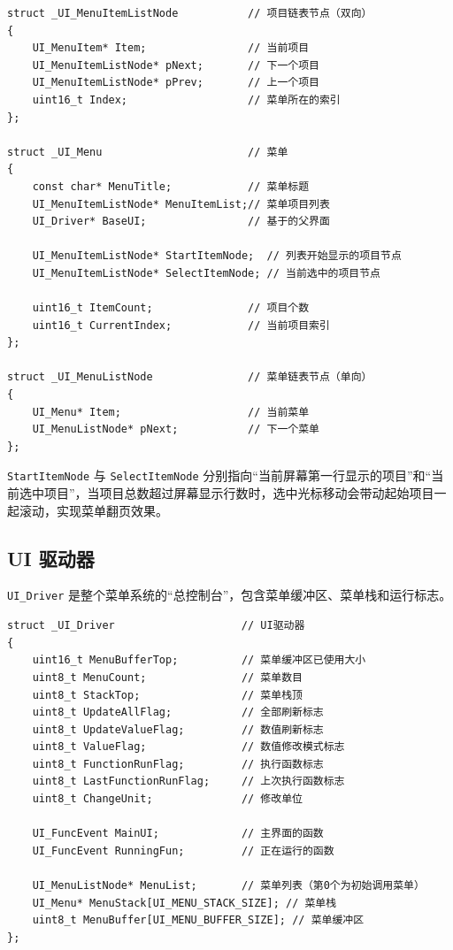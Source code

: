 \begin{lstlisting}[style=c]
struct _UI_MenuItemListNode           // 项目链表节点（双向）
{
    UI_MenuItem* Item;                // 当前项目
    UI_MenuItemListNode* pNext;       // 下一个项目
    UI_MenuItemListNode* pPrev;       // 上一个项目
    uint16_t Index;                   // 菜单所在的索引
};

struct _UI_Menu                       // 菜单
{
    const char* MenuTitle;            // 菜单标题
    UI_MenuItemListNode* MenuItemList;// 菜单项目列表
    UI_Driver* BaseUI;                // 基于的父界面

    UI_MenuItemListNode* StartItemNode;  // 列表开始显示的项目节点
    UI_MenuItemListNode* SelectItemNode; // 当前选中的项目节点

    uint16_t ItemCount;               // 项目个数
    uint16_t CurrentIndex;            // 当前项目索引
};

struct _UI_MenuListNode               // 菜单链表节点（单向）
{
    UI_Menu* Item;                    // 当前菜单
    UI_MenuListNode* pNext;           // 下一个菜单
};
\end{lstlisting}

\texttt{StartItemNode} 与 \texttt{SelectItemNode} 分别指向“当前屏幕第一行显示的项目”和“当前选中项目”，当项目总数超过屏幕显示行数时，选中光标移动会带动起始项目一起滚动，实现菜单翻页效果。

\subsection{UI 驱动器}

\texttt{UI\_Driver} 是整个菜单系统的“总控制台”，包含菜单缓冲区、菜单栈和运行标志。

\begin{lstlisting}[style=c]
struct _UI_Driver                    // UI驱动器
{
    uint16_t MenuBufferTop;          // 菜单缓冲区已使用大小
    uint8_t MenuCount;               // 菜单数目
    uint8_t StackTop;                // 菜单栈顶
    uint8_t UpdateAllFlag;           // 全部刷新标志
    uint8_t UpdateValueFlag;         // 数值刷新标志
    uint8_t ValueFlag;               // 数值修改模式标志
    uint8_t FunctionRunFlag;         // 执行函数标志
    uint8_t LastFunctionRunFlag;     // 上次执行函数标志
    uint8_t ChangeUnit;              // 修改单位

    UI_FuncEvent MainUI;             // 主界面的函数
    UI_FuncEvent RunningFun;         // 正在运行的函数

    UI_MenuListNode* MenuList;       // 菜单列表（第0个为初始调用菜单）
    UI_Menu* MenuStack[UI_MENU_STACK_SIZE]; // 菜单栈
    uint8_t MenuBuffer[UI_MENU_BUFFER_SIZE]; // 菜单缓冲区
};
\end{lstlisting}


